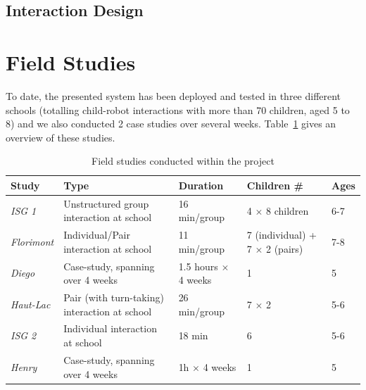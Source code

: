 \documentclass{article}
\begin{document}
\subsection{Interaction Design}



\section{Field Studies}

To date, the presented system has been deployed and tested in three different
schools (totalling child-robot interactions with more than 70 children, aged 5
to 8) and we also conducted 2 case studies over several weeks.
Table~\ref{studies} gives an overview of these studies.

\begin{table}[ht!]
\centering
\caption{\small Field studies conducted within the project}
\label{studies}
\begin{tabular}{@{}lp{4.5cm}p{2.2cm}p{2.5cm}l@{}}
\toprule
{\bf Study}     & {\bf Type}                                    & {\bf Duration}              & {\bf Children \#}                     & {\bf Ages} \\ \midrule
{\it ISG 1}     & Unstructured group interaction at school      & 16 min/group               & 4 $\times$ 8 children                 & 6-7        \\
{\it Florimont} & Individual/Pair interaction at school         & 11 min/group               & 7 (individual) + 7 $\times$ 2 (pairs) & 7-8        \\
{\it Diego}     & Case-study, spanning over 4 weeks              & 1.5 hours $\times$ 4 weeks & 1                                     & 5          \\
{\it Haut-Lac}  & Pair (with turn-taking) interaction at school & 26 min/group                            & 7 $\times$ 2                          & 5-6        \\
{\it ISG 2}     & Individual interaction at school              & 18 min                            & 6                                     & 5-6        \\
{\it Henry}     & Case-study, spanning over 4 weeks              & 1h $\times$ 4 weeks        & 1                                     & 5          \\ \bottomrule
\end{tabular}
\end{table}
\end{document}
